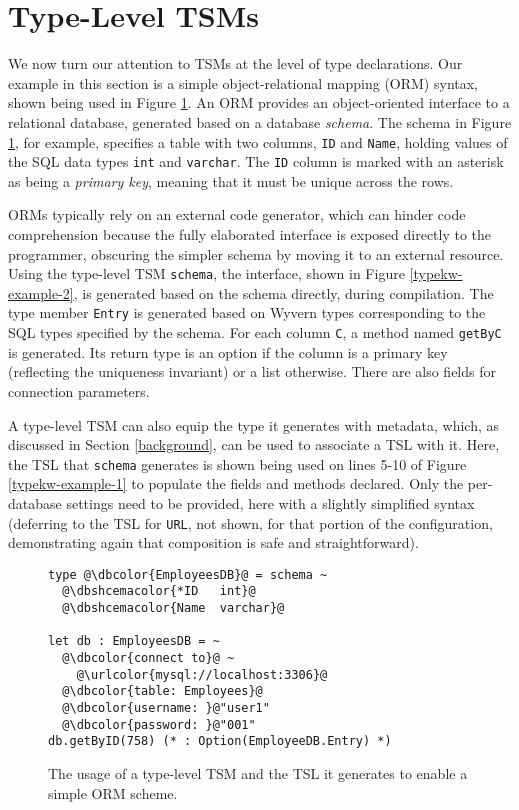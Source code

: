 \documentclass{sig-alternate}
\newcommand{\urlcolor}[1]{\textcolor[HTML]{FFCC33}{#1}}
\newcommand{\dbcolor}[1]{\textcolor[HTML]{FF47FF}{#1}}
\newcommand{\dbshcemacolor}[1]{\textcolor[HTML]{5AC3D1}{#1}}
\newcommand{\mycaption}[1]{\vspace{-4px}\caption{#1}\vspace{-2px}}
\begin{document}
\section{Type-Level TSM\lowercase{s}}
We now turn our attention to TSMs at the level of type declarations. Our example in this section is a simple object-relational mapping (ORM) syntax, shown being used in Figure \ref{f-tykwexample}. An ORM provides an object-oriented interface to a relational database, generated based on a database \emph{schema}. The schema in Figure \ref{f-tykwexample}, for example, specifies a table with two columns, \verb|ID| and \verb|Name|, holding values of the SQL data types \verb|int| and \verb|varchar|. The \verb|ID| column is marked with an asterisk as being a \emph{primary key}, meaning that it must be unique across the rows. 

ORMs typically rely on an external code generator, which can hinder code comprehension because the fully elaborated interface is exposed directly to the programmer, obscuring the simpler schema by moving it to an external resource. Using the type-level TSM \verb|schema|, the interface, shown in Figure \ref{typekw-example-2}, is generated based on the schema directly, during compilation. The type member \verb|Entry| is generated based on Wyvern types corresponding to the SQL types specified by the schema. For each column \verb|C|, a method named \verb|getByC| is generated. Its return type is an option if the column is a primary key (reflecting the uniqueness invariant) or a list otherwise. There are also fields for connection parameters. 

A type-level TSM can also equip the type it generates with metadata, which, as discussed in Section \ref{background}, can be used to associate a TSL with it. Here, the TSL that \verb|schema| generates is shown being used on lines 5-10 of Figure \ref{typekw-example-1} to populate the fields and methods declared. Only the per-database settings need to be provided, here with a slightly simplified syntax (deferring to the TSL for \verb|URL|, not shown, for that portion of the configuration, demonstrating again that composition is safe and straightforward).%

\begin{figure}[t]
\begin{lstlisting}[style=wyvern]
type @\dbcolor{EmployeesDB}@ = schema ~
  @\dbshcemacolor{*ID   int}@
  @\dbshcemacolor{Name  varchar}@

let db : EmployeesDB = ~
  @\dbcolor{connect to}@ ~
    @\urlcolor{mysql://localhost:3306}@
  @\dbcolor{table: Employees}@
  @\dbcolor{username: }@"user1"
  @\dbcolor{password: }@"001"
db.getByID(758) (* : Option(EmployeeDB.Entry) *)
\end{lstlisting}
\mycaption{The usage of a type-level TSM and the TSL it generates to enable a simple ORM scheme.}
\label{f-tykwexample}
\end{figure}
\end{document}
